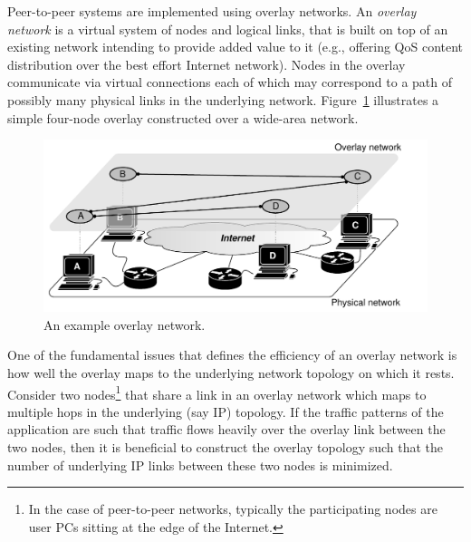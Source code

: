 Peer-to-peer systems are implemented using overlay networks. An \emph{overlay
network} is a virtual system of nodes and logical links, that is built on top of
an existing network intending to provide added value to it (e.g., offering QoS
content distribution over the best effort Internet network). Nodes in the
overlay communicate via virtual connections each of which may correspond to a
path of possibly many physical links in the underlying network.
Figure~\ref{figure:overlay} illustrates a simple four-node overlay constructed
over a wide-area network.

\begin{figure}
\centering
  \includegraphics[scale=0.7]{img/pdf/under-over-lay.pdf}
\caption{An example overlay network.}
\label{figure:overlay}
\end{figure}

One of the fundamental issues that defines the efficiency of an overlay network
is how well the overlay maps to the underlying network topology on which it
rests. Consider two nodes\footnote{In the case of peer-to-peer networks,
typically the participating nodes are user PCs sitting at the edge of the
Internet.} that share a link in an overlay network which maps to multiple hops
in the underlying (say IP) topology. If the traffic patterns of the application
are such that traffic flows heavily over the overlay link between the two nodes,
then it is beneficial to construct the overlay topology such that the number of
underlying IP links between these two nodes is minimized.

